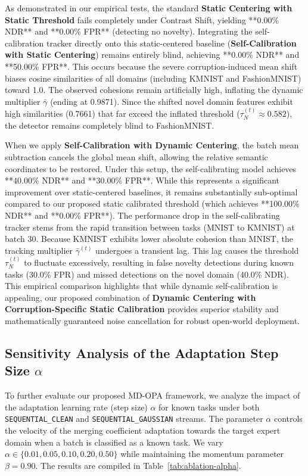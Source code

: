 \documentclass{article}
\theoremstyle{plain}
\theoremstyle{definition}
\theoremstyle{remark}
\begin{document}
As demonstrated in our empirical tests, the standard \textbf{Static Centering with Static Threshold} fails completely under Contrast Shift, yielding **0.00\% NDR** and **0.00\% FPR** (detecting no novelty). Integrating the self-calibration tracker directly onto this static-centered baseline (\textbf{Self-Calibration with Static Centering}) remains entirely blind, achieving **0.00\% NDR** and **50.00\% FPR**. This occurs because the severe corruption-induced mean shift biases cosine similarities of all domains (including KMNIST and FashionMNIST) toward 1.0. The observed cohesions remain artificially high, inflating the dynamic multiplier $\bar{\gamma}$ (ending at 0.9871). Since the shifted novel domain features exhibit high similarities (0.7661) that far exceed the inflated threshold ($\tau_N^{(t)} \approx 0.582$), the detector remains completely blind to FashionMNIST.

When we apply \textbf{Self-Calibration with Dynamic Centering}, the batch mean subtraction cancels the global mean shift, allowing the relative semantic coordinates to be restored. Under this setup, the self-calibrating model achieves **40.00\% NDR** and **30.00\% FPR**. While this represents a significant improvement over static-centered baselines, it remains substantially sub-optimal compared to our proposed static calibrated threshold (which achieves **100.00\% NDR** and **0.00\% FPR**). The performance drop in the self-calibrating tracker stems from the rapid transition between tasks (MNIST to KMNIST) at batch 30. Because KMNIST exhibits lower absolute cohesion than MNIST, the tracking multiplier $\bar{\gamma}^{(t)}$ undergoes a transient lag. This lag causes the threshold $\tau_N^{(t)}$ to fluctuate excessively, resulting in false novelty detections during known tasks (30.0\% FPR) and missed detections on the novel domain (40.0\% NDR). This empirical comparison highlights that while dynamic self-calibration is appealing, our proposed combination of \textbf{Dynamic Centering with Corruption-Specific Static Calibration} provides superior stability and mathematically guaranteed noise cancellation for robust open-world deployment.

\subsection{Sensitivity Analysis of the Adaptation Step Size $\alpha$}
To further evaluate our proposed MD-OPA framework, we analyze the impact of the adaptation learning rate (step size) $\alpha$ for known tasks under both \texttt{SEQUENTIAL\_CLEAN} and \texttt{SEQUENTIAL\_GAUSSIAN} streams. The parameter $\alpha$ controls the velocity of the merging coefficient adaptation towards the target expert domain when a batch is classified as a known task. We vary $\alpha \in \{0.01, 0.05, 0.10, 0.20, 0.50\}$ while maintaining the momentum parameter $\beta = 0.90$. The results are compiled in Table~\ref{tab:ablation-alpha}.
\end{document}
